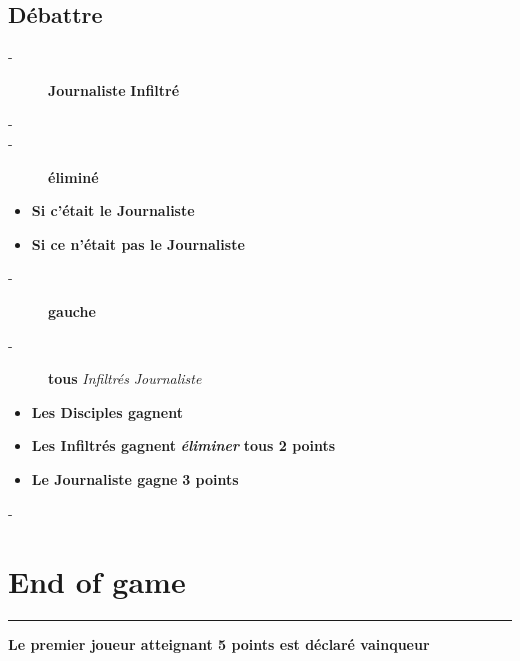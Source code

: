\documentclass{article}%
\begin{document}
%
\subsection{ Débattre
}%
\label{subsec:Dbattre}%
\begin{description}%
\item[{-} ]%
%
\textbf{Journaliste}%
\textit{ }%
\textbf{Infiltré}%
\item[{-} ]%
%
\item[{-} ]%
%
\textbf{éliminé}%
\textit{ }%
\end{description}%
\begin{itemize}%
\item%
%
\textbf{Si c’était le Journaliste}%
\item%
%
\textbf{Si ce n’était pas le Journaliste}%
\end{itemize}%
\begin{description}%
\item[{-} ]%
%
\textbf{gauche}%
\textit{ }%
\item[{-} ]%
%
\textbf{tous}%
\textit{ }%
\textit{Infiltrés}%
\textit{ }%
\textit{Journaliste}%
\textit{ }%
\end{description}%
\begin{itemize}%
\item%
%
\textbf{Les Disciples gagnent}%
\textit{ }%
\item%
%
\textbf{Les Infiltrés gagnent}%
\textit{ }%
\textbf{\textit{éliminer}}%
\textit{ }%
\textbf{tous 2 points}%
\textit{ }%
\item%
%
\textbf{Le Journaliste gagne}%
\textit{ }%
\textbf{3 points}%
\end{itemize}%
\begin{description}%
\item[{-} ]%
%
\end{description}

%
\section{ End of game
}%
\label{sec:Endofgame}%
\rule{18cm}{0.07cm}\break%
\textbf{Le premier joueur atteignant 5 points est déclaré vainqueur}

%
\end{document}
